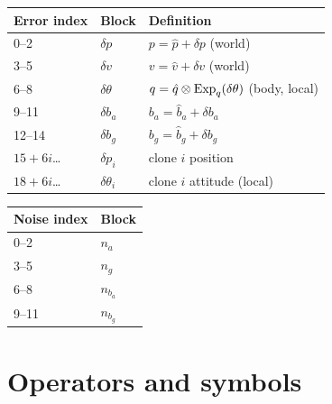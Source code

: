 \begin{center}\small
\begin{tabular}{@{}l l l@{}}
\toprule
Error index & Block & Definition \\
\midrule
0--2 & $\delta p$ & $p = \hat p + \delta p$ (world) \\
3--5 & $\delta v$ & $v = \hat v + \delta v$ (world) \\
6--8 & $\delta\theta$ & $q = \hat q\otimes\operatorname{Exp}_q(\delta\theta)$ (body, local) \\
9--11 & $\delta b_a$ & $b_a = \hat b_a + \delta b_a$ \\
12--14 & $\delta b_g$ & $b_g = \hat b_g + \delta b_g$ \\
$15+6i$\dots & $\delta p_i$ & clone $i$ position \\
$18+6i$\dots & $\delta\theta_i$ & clone $i$ attitude (local) \\
\bottomrule
\end{tabular}
\qquad
\begin{tabular}{@{}l l@{}}
\toprule
Noise index & Block \\
\midrule
0--2 & $n_a$ \\
3--5 & $n_g$ \\
6--8 & $n_{b_a}$ \\
9--11 & $n_{b_g}$ \\
\bottomrule
\end{tabular}
\end{center}

\section*{Operators and symbols}

